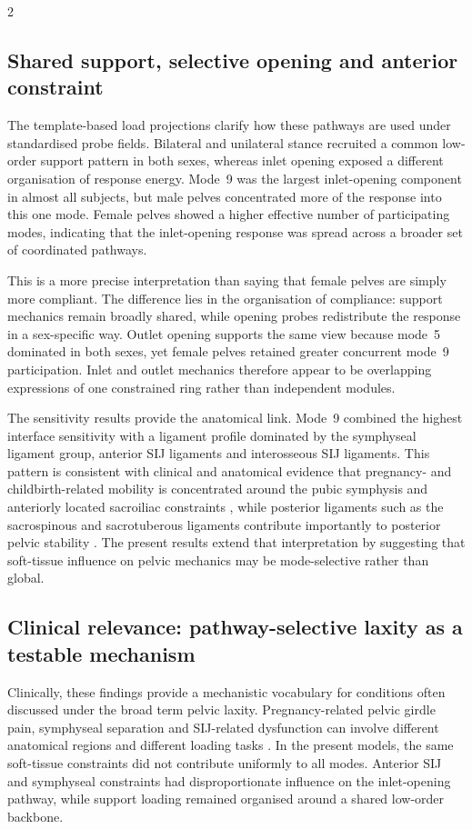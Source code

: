 \documentclass[openacc]{rsproca_new}
\begin{document}
\begin{multicols}{2}
\subsection{Shared support, selective opening and anterior constraint}

The template-based load projections clarify how these pathways are used under standardised probe fields. Bilateral and unilateral stance recruited a common low-order support pattern in both sexes, whereas inlet opening exposed a different organisation of response energy. Mode~9 was the largest inlet-opening component in almost all subjects, but male pelves concentrated more of the response into this one mode. Female pelves showed a higher effective number of participating modes, indicating that the inlet-opening response was spread across a broader set of coordinated pathways.

This is a more precise interpretation than saying that female pelves are simply more compliant. The difference lies in the organisation of compliance: support mechanics remain broadly shared, while opening probes redistribute the response in a sex-specific way. Outlet opening supports the same view because mode~5 dominated in both sexes, yet female pelves retained greater concurrent mode~9 participation. Inlet and outlet mechanics therefore appear to be overlapping expressions of one constrained ring rather than independent modules.

The sensitivity results provide the anatomical link. Mode~9 combined the highest interface sensitivity with a ligament profile dominated by the symphyseal ligament group, anterior SIJ ligaments and interosseous SIJ ligaments. This pattern is consistent with clinical and anatomical evidence that pregnancy- and childbirth-related mobility is concentrated around the pubic symphysis and anteriorly located sacroiliac constraints \cite{Damen2001,Pires2015,Cicek2015,Fiani2021}, while posterior ligaments such as the sacrospinous and sacrotuberous ligaments contribute importantly to posterior pelvic stability \cite{Hammer2019,Aldabe2019}. The present results extend that interpretation by suggesting that soft-tissue influence on pelvic mechanics may be mode-selective rather than global.

\subsection{Clinical relevance: pathway-selective laxity as a testable mechanism}

Clinically, these findings provide a mechanistic vocabulary for conditions often discussed under the broad term pelvic laxity. Pregnancy-related pelvic girdle pain, symphyseal separation and SIJ-related dysfunction can involve different anatomical regions and different loading tasks \cite{Damen2001,Vleeming2012,Kiapour2019,Stolarczyk2021}. In the present models, the same soft-tissue constraints did not contribute uniformly to all modes. Anterior SIJ and symphyseal constraints had disproportionate influence on the inlet-opening pathway, while support loading remained organised around a shared low-order backbone.


\end{multicols}
\end{document}
